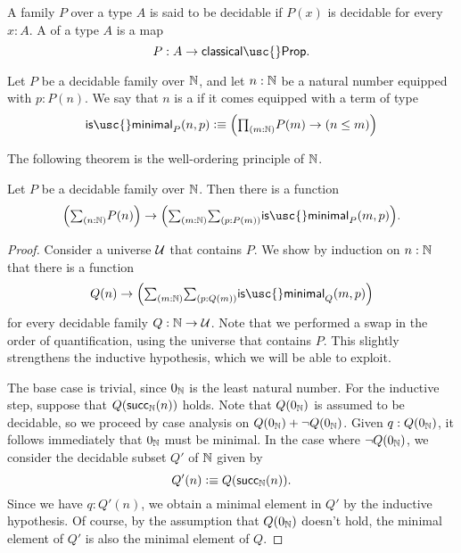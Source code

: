 \begin{defn}
  A family $P$ over a type $A$ is said to be decidable if $P(x)$ is decidable for every $x:A$. A  of a type $A$ is a map
  \begin{equation*}
    P:A\to\mathsf{classical\usc{}Prop}.
  \end{equation*}
\end{defn}

\begin{defn}
  Let $P$ be a decidable family over ${\mathbb{N}}$, and let $n:{\mathbb{N}}$ be a natural number equipped with $p:P(n)$. We say that $n$ is a  if it comes equipped with a term of type
  \begin{equation*}
    \mathsf{is\usc{}minimal}_P(n,p)\defeq \Big(\prd{m:\N}P(m)\to (n\leq m)\Big)
  \end{equation*}
\end{defn}

The following theorem is the well-ordering principle of ${\mathbb{N}}$. 

\begin{thm}
  Let $P$ be a decidable family over ${\mathbb{N}}$. Then there is a function
  \begin{equation*}
    \Big(\sm{n:\N}P(n)\Big)\to\Big(\sm{m:\N}{p:P(m)}\mathsf{is\usc{}minimal}_P(m,p)\Big).
  \end{equation*}
\end{thm}

\begin{proof}
  Consider a universe $\mathcal{U}$ that contains $P$. We show by induction on $n:{\mathbb{N}}$ that there is a function
  \begin{equation*}
    Q(n)\to \Big(\sm{m:\N}{p:Q(m)}\mathsf{is\usc{}minimal}_Q(m,p)\Big) 
  \end{equation*}
  for every decidable family $Q:{\mathbb{N}}\to\mathcal{U}$. Note that we performed a swap in the order of quantification, using the universe that contains $P$. This slightly strengthens the inductive hypothesis, which we will be able to exploit.

  The base case is trivial, since $0_{{\mathbb{N}}}$ is the least natural number. For the inductive step, suppose that $Q(\mathsf{succ}_{{\mathbb{N}}}(n))$ holds. Note that $Q(0_{{\mathbb{N}}})$ is assumed to be decidable, so we proceed by case analysis on $Q(0_{{\mathbb{N}}})+\neg Q(0_{{\mathbb{N}}})$. Given $q:Q(0_{{\mathbb{N}}})$, it follows immediately that $0_{{\mathbb{N}}}$ must be minimal. In the case where $\neg Q(0_{{\mathbb{N}}})$, we consider the decidable subset $Q'$ of ${\mathbb{N}}$ given by
  \begin{equation*}
    Q'(n)\vcentcolon\equiv Q(\mathsf{succ}_{{\mathbb{N}}}(n)).
  \end{equation*}
  Since we have $q:Q'(n)$, we obtain a minimal element in $Q'$ by the inductive hypothesis. Of course, by the assumption that $Q(0_{{\mathbb{N}}})$ doesn't hold, the minimal element of $Q'$ is also the minimal element of $Q$.
\end{proof}


